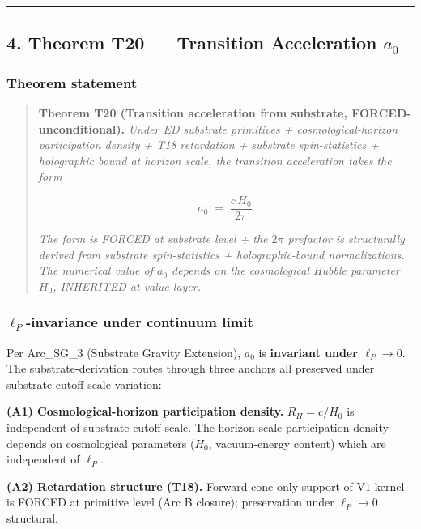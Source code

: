 \documentclass[
]{article}
\begin{document}
\begin{center}\rule{0.5\linewidth}{0.5pt}\end{center}

\subsection{\texorpdfstring{4. Theorem T20 --- Transition Acceleration
\(a_0\)}{4. Theorem T20 --- Transition Acceleration a\_0}}\label{theorem-t20-transition-acceleration-a_0}

\subsubsection{Theorem statement}\label{theorem-statement-1}

\begin{quote}
\textbf{Theorem T20 (Transition acceleration from substrate,
FORCED-unconditional).} \emph{Under ED substrate primitives +
cosmological-horizon participation density + T18 retardation + substrate
spin-statistics + holographic bound at horizon scale, the transition
acceleration takes the form}

\[a_0 \;=\; \frac{c\,H_0}{2\pi}.\]

\emph{The form is FORCED at substrate level + the \(2\pi\) prefactor is
structurally derived from substrate spin-statistics + holographic-bound
normalizations. The numerical value of \(a_0\) depends on the
cosmological Hubble parameter \(H_0\), INHERITED at value layer.}
\end{quote}

\subsubsection{\texorpdfstring{\(\ell_P\)-invariance under continuum
limit}{\textbackslash ell\_P-invariance under continuum limit}}\label{ell_p-invariance-under-continuum-limit}

Per Arc\_SG\_3 (Substrate Gravity Extension), \(a_0\) is
\textbf{invariant under \(\ell_P \to 0\)}. The substrate-derivation
routes through three anchors all preserved under substrate-cutoff scale
variation:

\textbf{(A1) Cosmological-horizon participation density.}
\(R_H = c/H_0\) is independent of substrate-cutoff scale. The
horizon-scale participation density depends on cosmological parameters
(\(H_0\), vacuum-energy content) which are independent of \(\ell_P\).

\textbf{(A2) Retardation structure (T18).} Forward-cone-only support of
V1 kernel is FORCED at primitive level (Arc B closure); preservation
under \(\ell_P \to 0\) structural.
\end{document}

